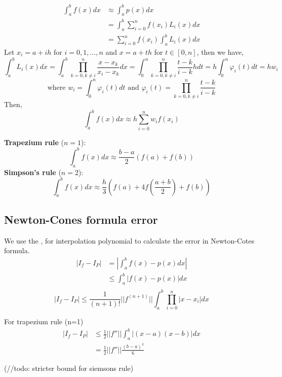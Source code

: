 \documentclass{article}
\begin{document}
		\begin{align*}
			\int_a^b f(x) dx &\approx \int_a^b p(x) dx\\
							 &= \int_a^b \sum_{i=0}^n f(x_i) L_i(x) dx\\
							 &= \sum_{i=0}^n f(x_i) \int_a^b L_i(x) dx
		\end{align*}
		Let $x_i = a+ih$ for $i=0,1,\hdots,n$ and $x= a + th$ for $t\in [0,n]$, then  we have,
		\[\int_a^b L_i(x) dx= \int_a^b \prod_{k=0, k\neq i}^n \frac{x-x_k}{x_i-x_k} dx = \int_0^n  \prod_{k=0, k\neq i}^n \frac{t-k}{i-k} h dt = h\int_0^n \varphi_i(t) dt = h w_i\]
		\[\text{where }w_i = \int_0^n \varphi_i(t) dt\text{    and   }\varphi_i(t) = \prod_{k=0, k\neq i}^n \frac{t-k}{i-k}\]
		\noindent Then,
		\[\boxed{\int_a^b f(x)dx \approx h \sum_{i=0}^n w_i f(x_i)} \]

		\noindent \textbf{Trapezium rule} ($n=1$):
			\[\int_a^b f(x)dx \approx \frac{b-a}{2} (f(a)+f(b))\]
		\textbf{Simpson's rule} ($n=2$):
			\[\int_a^b f(x)dx \approx \frac{h}{3} \left(f(a) + 4f\left(\frac{a+b}{2}\right)+ f(b)\right)\]


	\subsection{Newton-Cones formula error}
	We use the , for interpolation polynomial to calculate the error in Newton-Cotes formula.
		\begin{align*}
			|I_f - I_P|  &= \left|\int_a^b f(x)-p(x) dx \right|\\
						 &\leq \int_a^b |f(x)-p(x)|dx\\
			\end{align*}
		 \[\boxed{|I_f - I_P|  \leq \frac{1}{(n+1)!} ||f^{(n+1)}|| \int_a^b \prod_{i=0}^n |x-x_i| dx}\]

		For trapezium rule (n=1)
		\begin{align*}
		|I_f - I_P|  &\leq \frac{1}{2} ||f''|| \int_a^b |(x-a)(x-b)|dx\\
							&= \frac{1}{2} ||f''|| \frac{(b-a)^3}{6}
		\end{align*}


		(//todo: stricter bound for siemsons rule)
\end{document}
